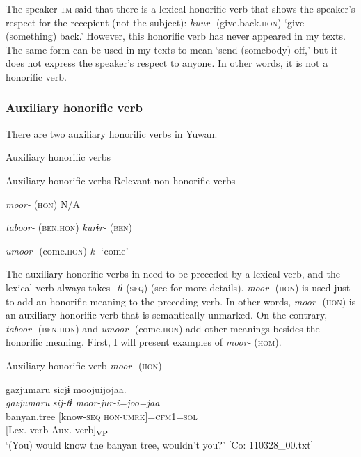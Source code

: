   The speaker \textsc{tm} said that there is a lexical honorific verb that shows the speaker’s respect for the recepient (not the subject): \textit{huur-} (give.back.\textsc{hon}) ‘give (something) back.’ However, this honorific verb has never appeared in my texts. The same form can be used in my texts to mean ‘send (somebody) off,’ but it does not express the speaker’s respect to anyone. In other words, it is not a honorific verb.

\subsubsection{Auxiliary honorific verb}

There are two auxiliary honorific verbs in Yuwan.

\begin{table}
\caption{\label{tab:key:73}}\textmd{ Auxiliary honorific verbs}

Auxiliary honorific verbs  Relevant non-honorific verbs

\textit{moor-} (\textsc{hon})  N/A

\textit{taboor-} (\textsc{ben}.\textsc{hon})  \textit{kurɨr-} (\textsc{ben})

\textit{umoor-} (come.\textsc{hon})  \textit{k-} ‘come’
\end{table}

The auxiliary honorific verbs in  need to be preceded by a lexical verb, and the lexical verb always takes \textit{-tɨ} (\textsc{seq}) (see  for more details). \textit{moor-} (\textsc{hon}) is used just to add an honorific meaning to the preceding verb. In other words, \textit{moor-} (\textsc{hon}) is an auxiliary honorific verb that is semantically unmarked. On the contrary, \textit{taboor-} (\textsc{ben}.\textsc{hon}) and \textit{umoor-} (come.\textsc{hon}) add other meanings besides the honorific meaning. First, I will present examples of \textit{moor-} (\textsc{hom}).

\textbf{\ea\label{ex:8-25}
}  Auxiliary honorific verb \textit{moor-} (\textsc{hon})


{\TM}
\gllll  gazjumaru  sicjɨ  moojuijojaa.\\
\textit{gazjumaru}  \textit{sij-tɨ}  \textit{moor-jur-i=joo=jaa}\\
banyan.tree  [know-\textsc{seq}  \textsc{hon}-\textsc{umrk}]=\textsc{cfm1}=\textsc{sol}\\
        {}[Lex. verb  Aux. verb]\textsubscript{VP}\\
\glt ‘(You) would know the banyan tree, wouldn’t you?’ [Co: 110328\_00.txt]

